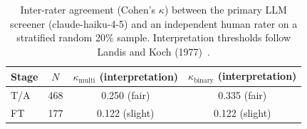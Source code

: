 \begin{table}[htbp]
\centering
\caption{Inter-rater agreement (Cohen's $\kappa$) between the primary LLM screener (claude-haiku-4-5) and an independent human rater on a stratified random 20\% sample. Interpretation thresholds follow Landis and Koch (1977)~\cite{landiskoch1977}.}
\label{tab:human-kappa-results}
\begin{tabular}{lccc}
\toprule
Stage & $N$ & $\kappa_{\text{multi}}$ (interpretation) & $\kappa_{\text{binary}}$ (interpretation) \\
\midrule
T/A & 468 & 0.250 (fair) & 0.335 (fair) \\
FT & 177 & 0.122 (slight) & 0.122 (slight) \\
\bottomrule
\end{tabular}
\end{table}